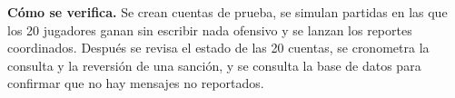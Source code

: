 \textbf{Cómo se verifica.} Se crean cuentas de prueba, se simulan partidas en las que los 20 jugadores ganan sin escribir nada ofensivo y se lanzan los reportes coordinados. Después se revisa el estado de las 20 cuentas, se cronometra la consulta y la reversión de una sanción, y se consulta la base de datos para confirmar que no hay mensajes no reportados.
